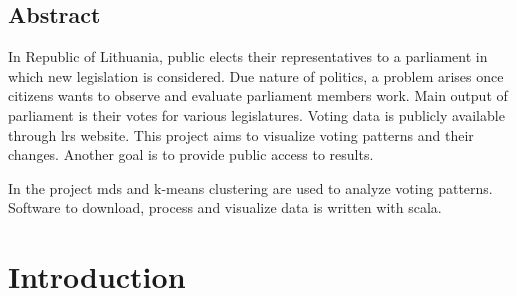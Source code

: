 \documentclass[a4paper,12pt]{article}
\begin{document}
   
    
    
    \begin{center}
        \section*{Abstract}
    \end{center}
        
        
        
        In Republic of Lithuania, public elects their representatives to a parliament in which new legislation is considered. Due nature of politics, a problem arises once citizens wants to observe and evaluate parliament members work. Main output of parliament is their votes for various legislatures. Voting data is publicly available through \gls{lrs} website. This project aims to visualize voting patterns and their changes. Another goal is to provide public access to results.
        
        In the project \gls{mds} and \gls{k-means} clustering are used to analyze voting patterns. Software to download, process and visualize  data is written with \gls{scala}.
        
        
        
    \clearpage
    
    \tableofcontents
    
    \clearpage
    
    \printglossary[type=\acronymtype]
    
    \clearpage
    
    \printglossary
    
    \clearpage
    
    
    \section{Introduction}
    
\end{document}
